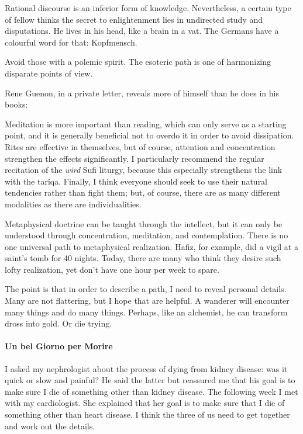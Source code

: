 Rational discourse is an inferior form of knowledge. Nevertheless, a certain type of fellow thinks the secret to enlightenment lies in undirected study and disputations. He lives in his head, like a brain in a vat. The Germans have a colourful word for that: Kopfmensch.

Avoid those with a polemic spirit. The esoteric path is one of harmonizing disparate points of view.

Rene Guenon, in a private letter, reveals more of himself than he does in his books:

\begin{quotex}
Meditation is more important than reading, which can only serve as a starting point, and it is generally beneficial not to overdo it in order to avoid dissipation. Rites are effective in themselves, but of course, attention and concentration strengthen the effects significantly. I particularly recommend the regular recitation of the \emph{wird} Sufi liturgy, because this especially strengthens the link with the tarîqa. Finally, I think everyone should seek to use their natural tendencies rather than fight them; but, of course, there are as many different modalities as there are individualities.
\end{quotex}


Metaphysical doctrine can be taught through the intellect, but it can only be understood through concentration, meditation, and contemplation. There is no one universal path to metaphysical realization. Hafiz, for example, did a vigil at a saint's tomb for 40 nights. Today, there are many who think they desire such lofty realization, yet don't have one hour per week to spare.

The point is that in order to describe a path, I need to reveal personal details. Many are not flattering, but I hope that are helpful. A wanderer will encounter many things and do many things. Perhaps, like an alchemist, he can transform dross into gold. Or die trying.

\paragraph{Un bel Giorno per Morire}


I asked my nephrologist about the process of dying from kidney disease: was it quick or slow and painful? He said the latter but reassured me that his goal is to make sure I die of something other than kidney disease. The following week I met with my cardiologist. She explained that her goal is to make sure that I die of something other than heart disease. I think the three of us need to get together and work out the details.

